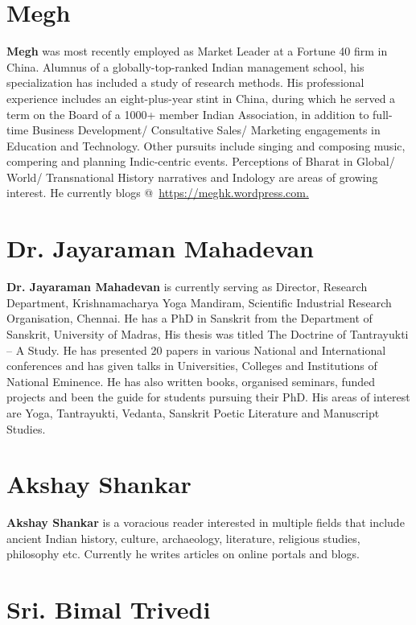 \section*{Megh}

\textbf{Megh} was most recently employed as Market Leader at a Fortune 40 firm in China. Alumnus of a globally-top-ranked Indian management school, his specialization has included a study of research methods. His professional experience includes an eight-plus-year stint in China, during which he served a term on the Board of a 1000+ member Indian Association, in addition to full-time Business Development/ Consultative Sales/ Marketing engagements in Education and Technology. Other pursuits include singing and composing music, compering and planning Indic-centric events. Perceptions of Bharat in Global/ World/ Transnational History narratives and Indology are areas of growing interest. He currently blogs @ \url{https://meghk.wordpress.com.}

\section*{Dr. Jayaraman Mahadevan}

\textbf{Dr. Jayaraman Mahadevan} is currently serving as Director, Research Department, Krishnamacharya Yoga Mandiram, Scientific Industrial Research Organisation, Chennai. He has a PhD in Sanskrit from the Department of Sanskrit, University of Madras, His thesis was titled The Doctrine of Tantrayukti – A Study. He has presented 20 papers in various National and International conferences and has given talks in Universities, Colleges and Institutions of National Eminence. He has also written books, organised seminars, funded projects and been the guide for students pursuing their PhD. His areas of interest are Yoga, Tantrayukti, Vedanta, Sanskrit Poetic Literature and Manuscript Studies.

\section*{Akshay Shankar}

\vskip -2pt

\textbf{Akshay Shankar} is a voracious reader interested in multiple fields that include ancient Indian history, culture, archaeology, literature, religious studies, philosophy etc. Currently he writes articles on online portals and blogs.

\section*{Sri. Bimal Trivedi}

